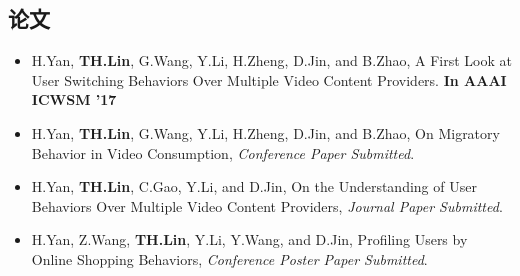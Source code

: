 \documentclass[letterpaper,11pt]{article}
\makeatletter
\newcommand{\resumeSubheadinghonor}[3]{
  \vspace{-1pt}\item
    \begin{tabular*}{0.97\textwidth}{l@{\extracolsep{\fill}}r}
      \textbf{#1} {#2}\\
      ~~\textit{\small#3}\\
    \end{tabular*}\vspace{-5pt}
}
\newcommand{\resumeSubheadinghonortwo}[4]{
  \vspace{-1pt}\item
    \begin{tabular*}{0.97\textwidth}{l@{\extracolsep{\fill}}r}
      \textbf{#1} {#2}\\
      ~~\textit{\small#3}\\
      ~~\textit{\small#4}\\
    \end{tabular*}\vspace{-5pt}
}
\newcommand{\sectionwithbox}[1]{
  \section[]{\colorbox[rgb]{0.8,0.8,0.8}{\textbf{#1}}}
}
\newcommand{\resumeSubheadingPublication}[1]{
  \vspace{-1pt}\item
      {#1}
    \vspace{-5pt}
}
\newcommand{\resumeSubHeadingListStart}{\begin{itemize}[leftmargin=*]}
\newcommand{\resumeSubHeadingListEnd}{\end{itemize}}
\makeatother
\begin{document}
\begin{CJK*}{UTF8}{gbsn}
    

    



\sectionwithbox{论文}
  \resumeSubHeadingListStart
  	\resumeSubheadingPublication{H.Yan, \large\textbf{TH.Lin}\normalsize, G.Wang, Y.Li, H.Zheng, D.Jin, and B.Zhao, A First Look at User Switching Behaviors Over Multiple Video Content Providers. \textbf{In AAAI ICWSM '17}}
	\resumeSubheadingPublication{H.Yan, \large\textbf{TH.Lin}\normalsize, G.Wang, Y.Li, H.Zheng, D.Jin, and B.Zhao, On Migratory Behavior in Video Consumption, \emph{Conference Paper Submitted}.}
	\resumeSubheadingPublication{H.Yan, \large\textbf{TH.Lin}\normalsize, C.Gao, Y.Li, and D.Jin, On the Understanding of User Behaviors Over Multiple Video Content Providers, \emph{Journal Paper Submitted}.}
	\resumeSubheadingPublication{H.Yan, Z.Wang, \large\textbf{TH.Lin}\normalsize, Y.Li, Y.Wang, and D.Jin, Profiling Users by Online Shopping Behaviors, \emph{Conference Poster Paper Submitted}.}
  \resumeSubHeadingListEnd
  
  
\end{CJK*}
\end{document}
